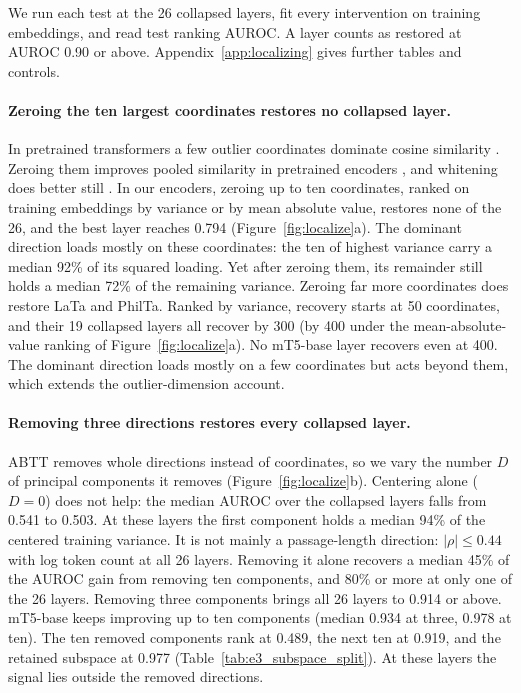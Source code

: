 \documentclass[11pt]{article}
\begin{document}
We run each test at the 26 collapsed layers, fit every intervention on training embeddings, and read test ranking AUROC.
A layer counts as restored at AUROC 0.90 or above.
Appendix~\ref{app:localizing} gives further tables and controls.

\paragraph{Zeroing the ten largest coordinates restores no collapsed layer.}
In pretrained transformers a few outlier coordinates dominate cosine similarity \citep{timkey2021rogue}.
Zeroing them improves pooled similarity in pretrained encoders \citep{luo2021positional}, and whitening does better still \citep{haemmerl2023anisotropy}.
In our encoders, zeroing up to ten coordinates, ranked on training embeddings by variance or by mean absolute value, restores none of the 26, and the best layer reaches 0.794 (Figure~\ref{fig:localize}a).
The dominant direction loads mostly on these coordinates: the ten of highest variance carry a median 92\% of its squared loading.
Yet after zeroing them, its remainder still holds a median 72\% of the remaining variance.
Zeroing far more coordinates does restore LaTa and PhilTa.
Ranked by variance, recovery starts at 50 coordinates, and their 19 collapsed layers all recover by 300 (by 400 under the mean-absolute-value ranking of Figure~\ref{fig:localize}a).
No mT5-base layer recovers even at 400.
The dominant direction loads mostly on a few coordinates but acts beyond them, which extends the outlier-dimension account.

\paragraph{Removing three directions restores every collapsed layer.}
ABTT removes whole directions instead of coordinates, so we vary the number $D$ of principal components it removes (Figure~\ref{fig:localize}b).
Centering alone ($D=0$) does not help: the median AUROC over the collapsed layers falls from 0.541 to 0.503.
At these layers the first component holds a median 94\% of the centered training variance.
It is not mainly a passage-length direction: $|\rho| \le 0.44$ with log token count at all 26 layers.
Removing it alone recovers a median 45\% of the AUROC gain from removing ten components, and 80\% or more at only one of the 26 layers.
Removing three components brings all 26 layers to 0.914 or above.
mT5-base keeps improving up to ten components (median 0.934 at three, 0.978 at ten).
The ten removed components rank at 0.489, the next ten at 0.919, and the retained subspace at 0.977 (Table~\ref{tab:e3_subspace_split}).
At these layers the signal lies outside the removed directions.
\end{document}

